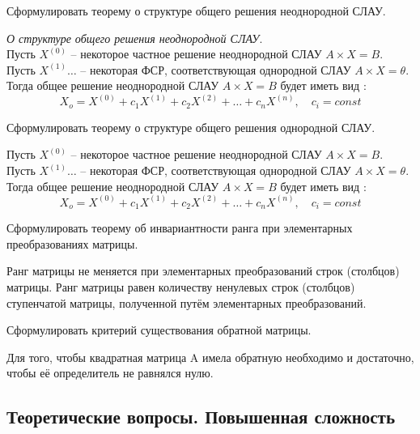 \begin{question}
  Сформулировать теорему о структуре общего решения неоднородной СЛАУ.
\end{question} 
\begin{answer}
  \textit{О структуре общего решения неоднородной СЛАУ}. \\ 
  Пусть $X^{(0)}$ -- некоторое частное решение неоднородной СЛАУ  $A \times X = B$.
  Пусть  $X^{(1)} \ldots$ -- некоторая ФСР, соответствующая однородной СЛАУ $A \times X=\theta$.
  Тогда общее решение неоднородной СЛАУ $A \times X = B$ будет иметь вид :  \[
    X_o = X^{(0)} + c_1 X^{(1)} + c_2 X^{(2)} + \ldots + c_n X^{(n)}, \quad c_i = const
  \] 
\end{answer} 

\begin{question}
  Сформулировать теорему о структуре общего решения однородной СЛАУ.
\end{question} 
\begin{answer}
  Пусть $X^{(0)}$ -- некоторое частное решение неоднородной СЛАУ  $A \times X = B$.
  Пусть  $X^{(1)} \ldots$ -- некоторая ФСР, соответствующая однородной СЛАУ $A \times X=\theta$.
  Тогда общее решение неоднородной СЛАУ $A \times X = B$ будет иметь вид :  \[
    X_o = X^{(0)} + c_1 X^{(1)} + c_2 X^{(2)} + \ldots + c_n X^{(n)}, \quad c_i = const
  \] 
\end{answer} 

\begin{question}
  Сформулировать теорему об инвариантности ранга при элементарных преобразованиях матрицы.
\end{question} 
\begin{answer}
  Ранг матрицы не меняется при элементарных преобразований строк (столбцов) матрицы. Ранг матрицы равен количеству ненулевых строк (столбцов) ступенчатой матрицы, полученной путём элементарных преобразований.
\end{answer} 

\begin{question}
  Сформулировать критерий существования обратной матрицы.
\end{question} 
\begin{answer}
  Для того, чтобы квадратная матрица A имела обратную необходимо и достаточно, чтобы её определитель не равнялся нулю. 
\end{answer} 

\subsection{Теоретические вопросы. Повышенная сложность}

